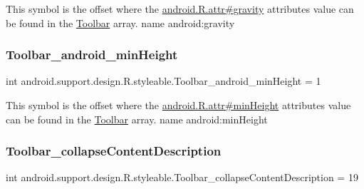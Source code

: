 This symbol is the offset where the \hyperlink{}{android.\+R.\+attr\#gravity} attribute\textquotesingle{}s value can be found in the \hyperlink{classandroid_1_1support_1_1design_1_1R_1_1styleable_a7783ebe780dbe2a845802a40519a46e9}{Toolbar} array.  name android\+:gravity \mbox{\label{classandroid_1_1support_1_1design_1_1R_1_1styleable_a896491cbc15c41005ac0372a7652eb54}} 
\subsubsection{\texorpdfstring{Toolbar\+\_\+android\+\_\+min\+Height}{Toolbar\_android\_minHeight}}
{\footnotesize\ttfamily int android.\+support.\+design.\+R.\+styleable.\+Toolbar\+\_\+android\+\_\+min\+Height = 1\hspace{0.3cm}{\ttfamily [static]}}

This symbol is the offset where the \hyperlink{}{android.\+R.\+attr\#min\+Height} attribute\textquotesingle{}s value can be found in the \hyperlink{classandroid_1_1support_1_1design_1_1R_1_1styleable_a7783ebe780dbe2a845802a40519a46e9}{Toolbar} array.  name android\+:min\+Height \mbox{\label{classandroid_1_1support_1_1design_1_1R_1_1styleable_a89d74d3552a12cf237615786e552301a}} 
\subsubsection{\texorpdfstring{Toolbar\+\_\+collapse\+Content\+Description}{Toolbar\_collapseContentDescription}}
{\footnotesize\ttfamily int android.\+support.\+design.\+R.\+styleable.\+Toolbar\+\_\+collapse\+Content\+Description = 19\hspace{0.3cm}{\ttfamily [static]}}

